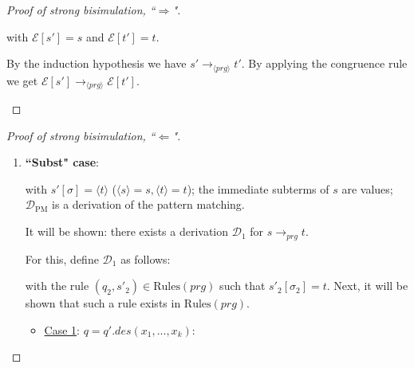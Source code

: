 \documentclass[11pt]{article} %
\begin{document}
\begin{proof}[Proof of strong bisimulation, ``$\Rightarrow$"]
\begin{enumerate}
\begin{prooftree}
\end{prooftree}

with $\mathcal{E}[s'] = s$ and $\mathcal{E}[t'] = t$.

By the induction hypothesis we have $s' \longrightarrow_{\langle prg \rangle} t'$. By applying the congruence rule we get $\mathcal{E}[s'] \longrightarrow_{\langle prg \rangle} \mathcal{E}[t']$.

\end{enumerate}

\end{proof}

\begin{proof}[Proof of strong bisimulation, ``$\Leftarrow$"] ~

\begin{enumerate}
\item \textbf{``Subst" case}:

\begin{prooftree}
\end{prooftree}

with $s'[\sigma] = \langle t \rangle$ ($\langle s \rangle = s, \langle t \rangle = t$); the immediate subterms of $s$ are values; $\mathcal{D}_{\textrm{PM}}$ is a derivation of the pattern matching.

It will be shown: there exists a derivation $\mathcal{D}_1$ for $s \longrightarrow_{prg} t$.

For this, define $\mathcal{D}_1$ as follows:

\begin{prooftree}
\end{prooftree}

with the rule $(q_2, s'_2) \in \textrm{Rules}(prg)$ such that $s'_2[\sigma_2] = t$. Next, it will be shown that such a rule exists in $\textrm{Rules}(prg)$.

\begin{itemize}
\item \underline{Case 1}: $q = q'.des(x_1, ..., x_k)$:


\end{itemize}
\end{enumerate}
\end{proof}
\end{document}
